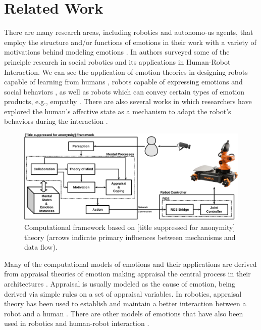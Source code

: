 \documentclass{sig-alternate-05-2015}
\begin{document}
\section{Related Work}

There are many research areas, including robotics and autonomo-us agents, that
employ the structure and/or functions of emotions in their work with a variety
of motivations behind modeling emotions
\cite{wehrle:motivations-modeling-emotion}. In
\cite{breazeal:sociable-interactive-robots} authors surveyed some of the
principle research in social robotics and its applications in Human-Robot
Interaction. We can see the application of emotion theories in designing robots
capable of learning from humans \cite{breazeal:expressive-behavior}, robots
capable of expressing emotions \cite{cameron:expression-hri}
\cite{shayganfar:methodology} and social behaviors
\cite{paiva:emotion-modeling}, as well as robots which can convey certain types
of emotion products, e.g., empathy \cite{leite:empathy-hri}. There are also
several works in which researchers have explored the human's affective state as
a mechanism to adapt the robot's behaviors during the interaction
\cite{breazeal:sociable-robot} \cite{liu:affect-robot-behavior}.

\begin{figure}[tbh]
  \centering
  \includegraphics[width=\textwidth]{figure/framework-croped.pdf}
  \caption{{\fontsize{9}{9}\selectfont Computational framework based on
  [title suppressed for anonymity] theory (arrows indicate primary influences
  between mechanisms and data flow).}}
  \label{fig:framework}
  \vspace*{-5mm}
\end{figure}

Many of the computational models of emotions and their applications are derived
from appraisal theories of emotion making appraisal the central process in
their architectures \cite{adam:bdi-emotional-companion}
\cite{marinier:behavior-emotion} \cite{marsella:ema-process-model}
\cite{si:modeling-appraisal-tom-journal}. Appraisal is usually modeled as the
cause of emotion, being derived via simple rules on a set of appraisal
variables. In robotics, appraisal theory has been used to establish and maintain
a better interaction between a robot and a human
\cite{castro:autonomous-robot-fear} \cite{kim:model-hri-appraisal}
\cite{pontier:women-robot-men} \cite{vogiatzis:robot-museum}. There are other
models of emotions that have also been used in robotics and human-robot
interaction \cite{klug:emotion-based-hri} \cite{lim:mei-motherese-ei}
\cite{zhang:service-robot-dimensional}.
\end{document}

